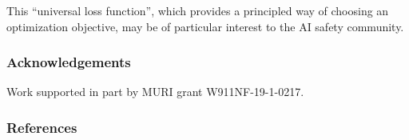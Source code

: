\documentclass[twoside]{article}
\theoremstyle{plain}
\theoremstyle{definition}
\begin{document}

This ``universal loss function'',
which provides a principled way of choosing an optimization objective,
may be of particular interest to the AI safety community.


\subsubsection*{Acknowledgements}
Work supported in part by MURI grant W911NF-19-1-0217. 


\subsubsection*{References}

\end{document}
